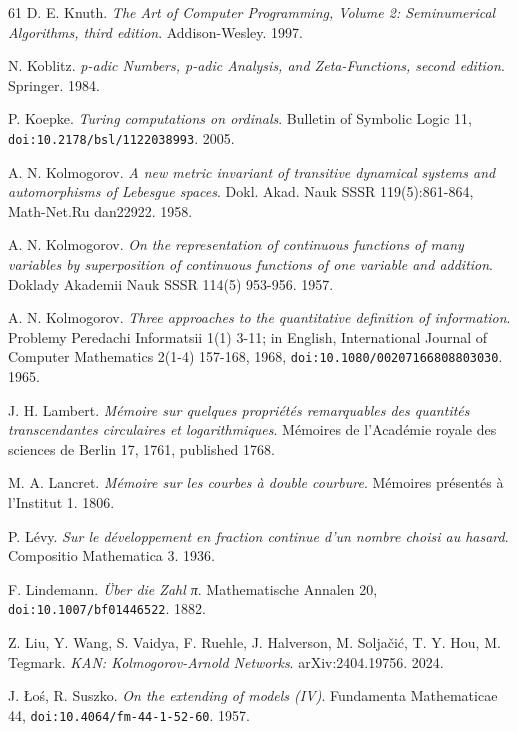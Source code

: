 \begin{thebibliography}{61}
D. E. Knuth. \emph{The Art of Computer Programming, Volume 2: Seminumerical Algorithms, third edition}. Addison-Wesley. 1997.

N. Koblitz. \emph{p-adic Numbers, p-adic Analysis, and Zeta-Functions, second edition}. Springer. 1984.

P. Koepke. \emph{Turing computations on ordinals}. Bulletin of Symbolic Logic 11, \texttt{doi:10.2178/\allowbreak{}bsl/\allowbreak{}1122038993}. 2005.

A. N. Kolmogorov. \emph{A new metric invariant of transitive dynamical systems and automorphisms of Lebesgue spaces}. Dokl. Akad. Nauk SSSR 119(5):861-864, Math-Net.Ru dan22922. 1958.

A. N. Kolmogorov. \emph{On the representation of continuous functions of many variables by superposition of continuous functions of one variable and addition}. Doklady Akademii Nauk SSSR 114(5) 953-956. 1957.

A. N. Kolmogorov. \emph{Three approaches to the quantitative definition of information}. Problemy Peredachi Informatsii 1(1) 3-11; in English, International Journal of Computer Mathematics 2(1-4) 157-168, 1968, \texttt{doi:10.1080/\allowbreak{}00207166808803030}. 1965.

J. H. Lambert. \emph{Mémoire sur quelques propriétés remarquables des quantités transcendantes circulaires et logarithmiques}. Mémoires de l'Académie royale des sciences de Berlin 17, 1761, published 1768.

M. A. Lancret. \emph{Mémoire sur les courbes à double courbure}. Mémoires présentés à l'Institut 1. 1806.

P. Lévy. \emph{Sur le développement en fraction continue d'un nombre choisi au hasard}. Compositio Mathematica 3. 1936.

F. Lindemann. \emph{Über die Zahl π}. Mathematische Annalen 20, \texttt{doi:10.1007/\allowbreak{}bf01446522}. 1882.

Z. Liu, Y. Wang, S. Vaidya, F. Ruehle, J. Halverson, M. Soljačić, T. Y. Hou, M. Tegmark. \emph{KAN: Kolmogorov-Arnold Networks}. arXiv:2404.19756. 2024.

J. Łoś, R. Suszko. \emph{On the extending of models (IV)}. Fundamenta Mathematicae 44, \texttt{doi:10.4064/\allowbreak{}fm-44-1-52-60}. 1957.


\end{thebibliography}
